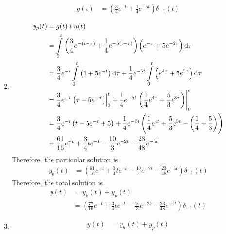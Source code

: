 \documentclass[fleqn, a4paper, 11pt, oneside]{amsart}
\theoremstyle{definition}
\theoremstyle{theorem}
\begin{document}
\begin{solution}
\begin{enumerate}[leftmargin=*]
\begin{align*}
				g(t) & = \left( \frac{3}{4} e^{-t} + \frac{1}{4} e^{-5 t} \right) \delta_{-1}(t)
			\end{align*}
		\item
			\begin{align*}
				y_p(t) & = g(t) \ast u(t)                                                                                                                                                                           \\
                                       & = \int\limits_{0}^{t} \left( \frac{3}{4} e^{-(t - \tau)} + \frac{1}{4} e^{-5(t - \tau)} \right) \left( e^{-\tau} + 5 e^{-2 \tau} \right) \dif \tau                                         \\
                                       & = \frac{3}{4} e^{-t} \int\limits_{0}^{t} \left( 1 + 5 e^{-t} \right) \dif \tau + \frac{1}{4} e^{-5 t} \int\limits_{0}^{t} \left( e^{4 \tau} + 5 e^{3 \tau} \right) \dif \tau               \\
                                       & = \frac{3}{4} e^{-t} \left. \left( \tau - 5 e^{-\tau} \right) \right|_{0}^{t} + \frac{1}{4} e^{-5 t} \left. \left( \frac{1}{4} e^{4 \tau} + \frac{5}{3} e^{3 \tau} \right) \right|_{0}^{t} \\
                                       & = \frac{3}{4} e^{-t} \left( t - 5 e^{-t} + 5 \right) + \frac{1}{4} e^{-5 t} \left( \frac{1}{4} e^{4 t} + \frac{5}{3} e^{3 t} - \left( \frac{1}{4} + \frac{5}{3} \right) \right)            \\
                                       & = \frac{61}{16} e^{-t} + \frac{3}{4} t e^{-t} - \frac{10}{3} e^{-2 t} - \frac{23}{48} e^{-5 t}
			\end{align*}
			Therefore, the particular solution is
			\begin{align*}
				y_p(t) & = \left( \frac{61}{16} e^{-t} + \frac{3}{4} t e^{-t} - \frac{10}{3} e^{-2 t} - \frac{23}{48} e^{-5 t} \right) \delta_{-1}(t)
			\end{align*}
			Therefore, the total solution is
			\begin{align*}
				y(t) & = y_h(t) + y_p(t) \\
                                     & = \left( \frac{77}{16} e^{-t} + \frac{3}{4} t e^{-t} - \frac{10}{3} e^{-2 t} - \frac{23}{48} e^{-5 t} \right) \delta_{-1}(t)
			\end{align*}
		\item
			\begin{align*}
				y(t)                             & = y_h(t) + y_p(t) \\

\end{align*}
\end{enumerate}
\end{solution}
\end{document}
